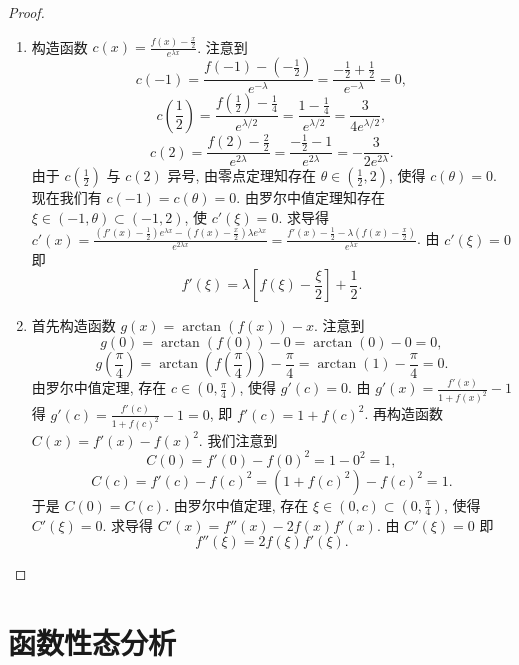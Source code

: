 \documentclass[lang=cn,10pt,thmcnt=section]{elegantbook}
\begin{document}
\begin{proof}
\begin{enumerate}[label=\textcolor{blue}{\arabic{enumi}.}, start=1]
		\item %
		构造函数 $c(x) = \frac{f(x) - \frac{x}{2}}{e^{\lambda x}}$. 注意到
		\[ c(-1) = \frac{f(-1) - (-\frac{1}{2})}{e^{-\lambda}} = \frac{-\frac{1}{2}+\frac{1}{2}}{e^{-\lambda}} = 0, \]
		\[ c\left(\frac{1}{2}\right) = \frac{f(\frac{1}{2}) - \frac{1}{4}}{e^{\lambda/2}} = \frac{1 - \frac{1}{4}}{e^{\lambda/2}} = \frac{3}{4e^{\lambda/2}}, \]
		\[ c(2) = \frac{f(2) - \frac{2}{2}}{e^{2\lambda}} = \frac{-\frac{1}{2}-1}{e^{2\lambda}} = -\frac{3}{2e^{2\lambda}}. \]
		由于 $c(\frac{1}{2})$ 与 $c(2)$ 异号, 由零点定理知存在 $\theta \in (\frac{1}{2}, 2)$, 使得 $c(\theta)=0$.
		现在我们有 $c(-1)=c(\theta)=0$. 由罗尔中值定理知存在 $\xi \in (-1, \theta) \subset (-1,2)$, 使 $c'(\xi)=0$.
		求导得 $c'(x) = \frac{(f'(x)-\frac{1}{2})e^{\lambda x} - (f(x)-\frac{x}{2})\lambda e^{\lambda x}}{e^{2\lambda x}} = \frac{f'(x)-\frac{1}{2} - \lambda(f(x)-\frac{x}{2})}{e^{\lambda x}}$.
		由 $c'(\xi)=0$ 即
		\[ f'(\xi) = \lambda\left[f(\xi) - \frac{\xi}{2}\right] + \frac{1}{2}. \]
	
		\item %
		首先构造函数 $g(x) = \arctan(f(x)) - x$. 注意到
		\[ g(0) = \arctan(f(0)) - 0 = \arctan(0) - 0 = 0, \]
		\[ g\left(\frac{\pi}{4}\right) = \arctan\left(f\left(\frac{\pi}{4}\right)\right) - \frac{\pi}{4} = \arctan(1) - \frac{\pi}{4} = 0. \]
		由罗尔中值定理, 存在 $c \in (0, \frac{\pi}{4})$, 使得 $g'(c)=0$.
		由 $g'(x) = \frac{f'(x)}{1+f(x)^2}-1$ 得 $g'(c)=\frac{f'(c)}{1+f(c)^2}-1=0$, 即 $f'(c) = 1+f(c)^2$.
		再构造函数 $C(x) = f'(x) - f(x)^2$. 我们注意到
		\[ C(0) = f'(0) - f(0)^2 = 1 - 0^2 = 1, \]
		\[ C(c) = f'(c) - f(c)^2 = (1+f(c)^2) - f(c)^2 = 1. \]
		于是 $C(0)=C(c)$. 由罗尔中值定理, 存在 $\xi \in (0, c) \subset (0, \frac{\pi}{4})$, 使得 $C'(\xi)=0$.
		求导得 $C'(x) = f''(x) - 2f(x)f'(x)$.
		由 $C'(\xi)=0$ 即
		\[ f''(\xi) = 2f(\xi)f'(\xi). \]
	\end{enumerate}
	
\end{proof}
\section{函数性态分析}
\end{document}
